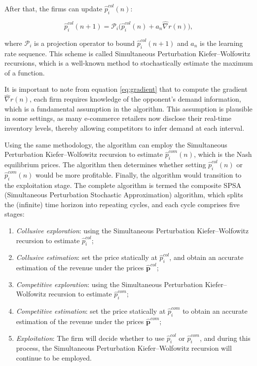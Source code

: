\documentclass[mnsc,nonblindrev]{workingpaper}
\begin{document}
After that, the firms can update $\hat{p}_i^{col}(n)$:

\begin{equation}
    \hat{p}_{i}^{col}(n+1)=\mathcal{P}_{i}\Bigg(\hat{p}_{i}^{col}(n)+a_{n}\hat{\nabla}r(n)\Bigg),
\end{equation}

where $\mathcal{P}_{i}$ is a projection operator to bound $\hat{p}_{i}^{col}(n+1)$ and $a_n$ is the learning rate sequence. This scheme is called Simultaneous Perturbation Kiefer–Wolfowitz recursions, which is a well-known method to stochastically estimate the maximum of a function.

It is important to note from equation \ref{eq:gradient} that to compute the gradient $\hat{\nabla}r(n)$, each firm requires knowledge of the opponent's demand information, which is a fundamental assumption in the algorithm. This assumption is plausible in some settings, as many e-commerce retailers now disclose their real-time inventory levels, thereby allowing competitors to infer demand at each interval.

Using the same methodology, the algorithm can employ the Simultaneous Perturbation Kiefer–Wolfowitz recursion to estimate $\hat{p}_i^{com}(n)$, which is the Nash equilibrium prices. The algorithm then determines whether setting $\hat{p}_i^{col}(n)$ or $\hat{p}_i^{com}(n)$ would be more profitable. Finally, the algorithm would transition to the exploitation stage. The complete algorithm is termed the composite SPSA (Simultaneous Perturbation Stochastic Approximation) algorithm, which splits the (infinite) time horizon into repeating cycles, and each cycle comprises five stages:

\begin{enumerate}
    \item \textit{Collusive exploration}: using the Simultaneous Perturbation Kiefer–Wolfowitz recursion to estimate $\hat{p}_{i}^{col}$;
    \item \textit{Collusive estimation}: set the price statically at $\hat{p}_{i}^{col}$, and obtain an accurate estimation of the revenue under the prices $\hat{\mathbf{p}}^{col}$;
    \item \textit{Competitive exploration}: using the Simultaneous Perturbation Kiefer–Wolfowitz recursion to estimate $\hat{p}_{i}^{com}$;
    \item \textit{Competitive estimation}: set the price statically at $\hat{p}_{i}^{com}$ to obtain an accurate estimation of the revenue under the prices $\hat{\mathbf{p}}^{com}$;
    \item \textit{Exploitation}: The firm will decide whether to use $\hat{p}_{i}^{col}$ or $\hat{p}_{i}^{com}$, and during this process, the Simultaneous Perturbation Kiefer–Wolfowitz recursion will continue to be employed.
\end{enumerate}
\end{document}
